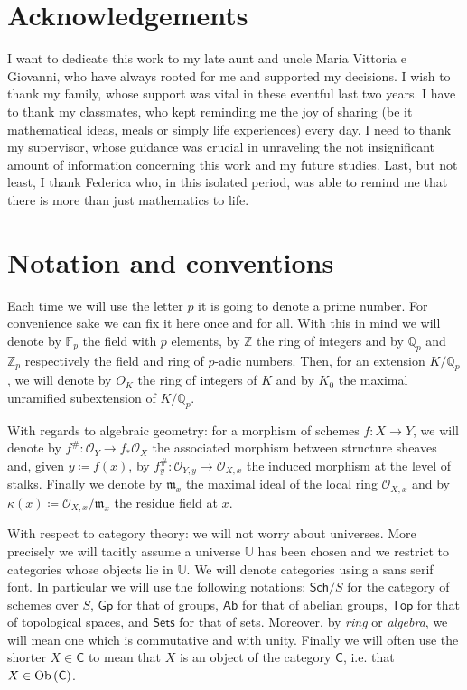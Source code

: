 \section*{Acknowledgements}
I want to dedicate this work to my late aunt and uncle Maria Vittoria e Giovanni,
who have always rooted for me and supported my decisions.
I wish to thank my family, whose support was vital in these eventful last two years.
I have to thank my classmates, who kept reminding me the joy of sharing
(be it mathematical ideas, meals or simply life experiences) every day.
I need to thank my supervisor, whose guidance was crucial in unraveling
the not insignificant amount of information concerning this work and my future studies.
Last, but not least, I thank Federica who, in this isolated period,
was able to remind me that there is more than just mathematics to life.
\newpage


\section*{Notation and conventions}
Each time we will use the letter $p$ it is going to denote a prime number.
For convenience sake we can fix it here once and for all.
With this in mind we will denote by $\mathbb{F}_{p}$ the field with $p$ elements,
by $\mathbb{Z}$ the ring of integers and by $\mathbb{Q}_p$ and $\mathbb{Z}_{p}$
respectively the field and ring of $p$-adic numbers.
Then, for an extension $K/\mathbb{Q}_p$, we will denote by $O_K$ the ring of
integers of $K$ and by $K_0$ the maximal unramified subextension of $K/\mathbb{Q}_p$.

With regards to algebraic geometry: for a morphism of schemes $f\colon X \to Y$,
we will denote by $f^{\#}\colon \mathcal{O}_{ Y } \to f_*\mathcal{O}_{ X }$ the
associated morphism between structure sheaves and, given $y \coloneqq f(x)$,
by $f_y^{\#}\colon \mathcal{O}_{ Y,y } \to \mathcal{O}_{ X,x }$ the induced morphism
at the level of stalks.
Finally we denote by $\mathfrak{m}_x$ the maximal ideal of the local ring
$\mathcal{O}_{ X,x }$ and by $\kappa(x) \coloneqq \mathcal{O}_{ X,x }/\mathfrak{m}_x$
the residue field at $x$.

With respect to category theory:
we will not worry about universes. More precisely we will
tacitly assume a universe $\mathbb{U}$ has been chosen
and we restrict to categories whose objects lie in $\mathbb{U}$.
We will denote categories using a sans serif font.
In particular we will use the following notations:
$\mathsf{Sch}/S$ for the category of schemes over $S$,
$\mathsf{Gp}$ for that of groups,
$\mathsf{Ab}$ for that of abelian groups,
$\mathsf{Top}$ for that of topological spaces,
and $\mathsf{Sets}$ for that of sets.
Moreover, by \emph{ring} or \emph{algebra}, we will mean one which is commutative and with unity.
Finally we will often use the shorter $X \in \mathsf{C}$ to mean that $X$ is an object
of the category $\mathsf{C}$, i.e. that $X \in \operatorname{Ob} \left(\mathsf{C}\right)$.

